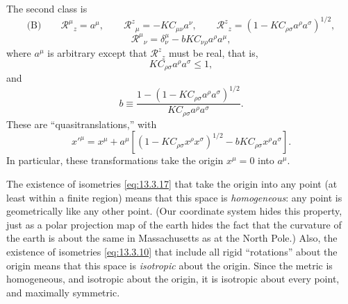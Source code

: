 The second class is
\begin{equation}
  \text{(B)}
  \qquad
  \mathcal R^\mu{}_{z}=a^\mu,
  \qquad
  \mathcal R^{z}{}_\mu=-K C_{\mu\nu}a^\nu,
  \qquad
  \mathcal R^{z}{}_{z}
  =
  \left(1-KC_{\rho\sigma}a^\rho a^\sigma\right)^{1/2},
  \tag{13.3.13}\label{eq:13.3.13}
\end{equation}
\begin{equation}
  \mathcal R^\mu{}_\nu
  =
  \delta^\mu_\nu-bK C_{\nu\rho}a^\rho a^\mu,
  \tag{13.3.14}\label{eq:13.3.14}
\end{equation}
where \(a^\mu\) is arbitrary except that
\(\mathcal R^{z}{}_{z}\) must be real, that is,
\begin{equation}
  K C_{\rho\sigma}a^\rho a^\sigma\leq1,
  \tag{13.3.15}\label{eq:13.3.15}
\end{equation}
and
\begin{equation}
  b
  \equiv
  \frac{
    1-\left(1-KC_{\rho\sigma}a^\rho a^\sigma\right)^{1/2}
  }{
    KC_{\rho\sigma}a^\rho a^\sigma
  }.
  \tag{13.3.16}\label{eq:13.3.16}
\end{equation}
These are ``quasitranslations,'' with
\begin{equation}
  x'^\mu
  =
  x^\mu
  +
  a^\mu
  \left[
    \left(1-KC_{\rho\sigma}x^\rho x^\sigma\right)^{1/2}
    -bK C_{\rho\sigma}x^\rho a^\sigma
  \right].
  \tag{13.3.17}\label{eq:13.3.17}
\end{equation}
In particular, these transformations take the origin \(x^\mu=0\) into
\(a^\mu\).

The existence of isometries \eqref{eq:13.3.17} that take the origin into any
point (at least within a finite region) means that this space is
\emph{homogeneous}: any point is geometrically like any other point. (Our
coordinate system hides this property, just as a polar projection map of the
earth hides the fact that the curvature of the earth is about the same in
Massachusetts as at the North Pole.) Also, the existence of isometries
\eqref{eq:13.3.10} that include all rigid ``rotations'' about the origin means
that this space is \emph{isotropic} about the origin. Since the metric is
homogeneous, and isotropic about the origin, it is isotropic about every
point, and maximally symmetric.

